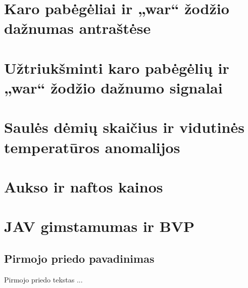 \documentclass[a4paper,12pt,fleqn]{article}
\begin{document}
    {}{}{}{}%
    {}

    \tableofcontents

    

    \section{Karo pabėgėliai ir „war“ žodžio dažnumas antraštėse}
    \label{sec:refugees}
    

    \section{Užtriukšminti karo pabėgėlių ir „war“ žodžio dažnumo signalai}
    \label{sec:noisy-refugees}
    

    \section{Saulės dėmių skaičius ir vidutinės temperatūros anomalijos}
    \label{sec:sunspots}
    

    \section{Aukso ir naftos kainos}
    \label{sec:oil-gold}
    

    \section{JAV gimstamumas ir BVP}
    \label{sec:gdp-births}
    

    





    \newpage
    \begin{appendices}
        \section{Pirmojo priedo pavadinimas}
        \label{app:a}
        Pirmojo priedo tekstas ...

    \end{appendices}
\end{document}
